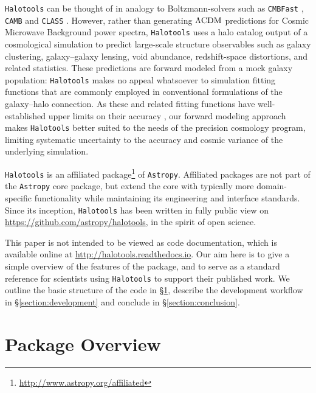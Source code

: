 \documentclass[twocolumn, tighten]{aastex6}
\begin{document}
{\tt Halotools} can be thought of in analogy to Boltzmann-solvers such as {\tt CMBFast} \citep{cmbfast}, {\tt CAMB} \citep{camb} and {\tt CLASS} \citep{class}. However, rather than generating $\Lambda{\rm CDM}$ predictions for Cosmic Microwave Background power spectra, {\tt Halotools} uses a halo catalog output of a cosmological simulation to predict large-scale structure observables such as galaxy clustering, galaxy--galaxy lensing, void abundance, redshift-space distortions, and related statistics. These predictions are forward modeled from a mock galaxy population: {\tt Halotools} makes no appeal whatsoever to simulation fitting functions \citep[e.g.,][]{sheth_tormen01,tinker05} that are commonly employed in conventional formulations of the galaxy--halo connection. As these and related fitting functions have well-established upper limits on their accuracy \citep[e.g.,][]{tinker08a}, our forward modeling approach makes {\tt Halotools} better suited to the needs of the precision cosmology program, limiting systematic uncertainty to the accuracy and cosmic variance of the underlying simulation.

{\tt Halotools} is an affiliated package\footnote{\url{http://www.astropy.org/affiliated}} of {\tt Astropy}. Affiliated packages are not part of the {\tt Astropy} core package, but extend the core with typically more domain-specific functionality while maintaining its engineering and interface standards. Since its inception, {\tt Halotools} has been written in fully public view on {\url{https://github.com/astropy/halotools}}, in the spirit of open science.

This paper is not intended to be viewed as code documentation, which is available online at {\url{http://halotools.readthedocs.io}}. Our aim here is to give a simple overview of the features of the package, and to serve as a standard reference for scientists using {\tt Halotools} to support their published work. We outline the basic structure of the code in \S\ref{section:overview}, describe the development workflow in \S\ref{section:development} and conclude in \S\ref{section:conclusion}.

\section{Package Overview}
\label{section:overview}
\end{document}
